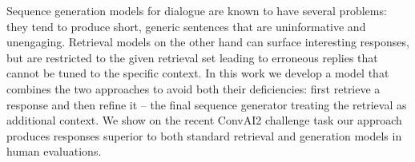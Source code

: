 Sequence generation models for dialogue are known to have several  problems: they tend to produce short, generic sentences that are uninformative and unengaging. Retrieval models on the other hand can surface interesting responses, but are restricted to the given retrieval set leading to erroneous replies that cannot be tuned to the specific context. In this work we develop a model that combines the two approaches to avoid both their deficiencies:  first retrieve a response and then refine it -- the final sequence generator treating the retrieval as additional context. We show on the recent ConvAI2 challenge task our approach produces responses superior to both standard retrieval and generation models in human evaluations.
